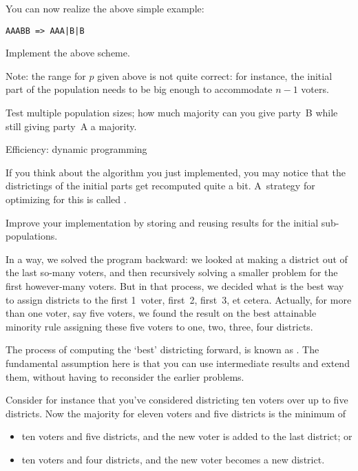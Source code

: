 You can now realize the above simple example:
\begin{verbatim}
AAABB => AAA|B|B
\end{verbatim}

\begin{exercise}
  Implement the above scheme.

  Note: the range for $p$ given above is not quite correct: for instance,
  the initial part of the population needs to be big enough to
  accommodate $n-1$ voters.
\end{exercise}

\begin{exercise}
  Test multiple population sizes; how much majority can you give
  party~B while still giving party~A a majority.
\end{exercise}

 {Efficiency: dynamic programming}

If you think about the algorithm you just implemented, you may notice
that the districtings of the initial parts get recomputed quite a bit.
A~strategy for optimizing for this is called .

\begin{exercise}
  Improve your implementation by storing and reusing results for the
  initial sub-populations.
\end{exercise}

In a way, we solved the program backward: we looked at making a
district out of the last so-many voters, and then recursively solving
a smaller problem for the first however-many voters. But in that
process, we decided what is the best way to assign districts to the
first 1~voter, first~2, first~3, et cetera. Actually, for more than
one voter, say five voters, we found the result on the best attainable
minority rule assigning these five voters to one, two, three, four
districts.

The process of computing the `best' districting forward, is known as
. The fundamental assumption here
is that you can use intermediate results and extend them, without
having to reconsider the earlier problems.

Consider for instance that you've considered districting ten voters over up to
five districts. Now the majority for eleven voters and five districts
is the minimum of
\begin{itemize}
\item ten voters and five districts, and the new voter is added to the
  last district; or
\item ten voters and four districts, and the new voter becomes a new district.
\end{itemize}

